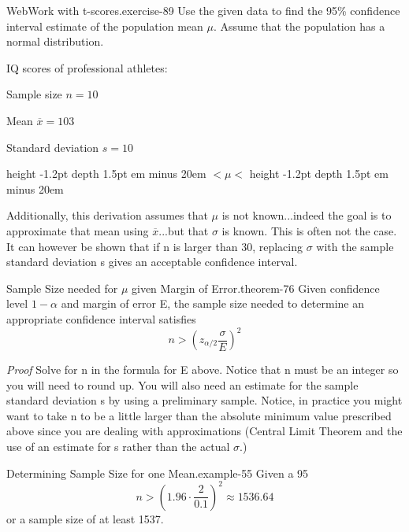 \documentclass[10pt,]{book}
\makeatletter
\newcommand{\fillin}[1]{\leavevmode\leaders\vrule height -1.2pt depth 1.5pt \hskip #1em minus #1em \null}
\renewcommand*{\proofname}{Proof}
\renewenvironment{proof}[1][\proofname]{\par
  \pushQED{\qed}%
  \normalfont \topsep6\p@\@plus6\p@\relax
  \trivlist
  \item\relax
    {\itshape
    #1\@addpunct{.}}\hspace\labelsep\ignorespaces
}{%
  \popQED\endtrivlist\@endpefalse
}
\numberwithin{equation}{section}
\newcommand{\lt}{<}
\newcommand{\gt}{>}
\makeatother
\begin{document}
\begin{inlineexercise}{WebWork with t-scores.}{exercise-89}%
\hypertarget{p-1319}{}%
Use the given data to find the 95\% confidence interval estimate of the population mean \(\mu\). Assume that the population has a normal distribution.%
\par
\hypertarget{p-1320}{}%
IQ scores of professional athletes:%
\par
\hypertarget{p-1321}{}%
Sample size \(n = 10\)%
\par
\hypertarget{p-1322}{}%
Mean \(\overline{x} = 103\)%
\par
\hypertarget{p-1323}{}%
Standard deviation \(s  = 10\)%
\par
\hypertarget{p-1324}{}%
 \fillin{20} \(\lt  \mu \lt \)  \fillin{20}%
\end{inlineexercise}
%
\par
\hypertarget{p-1325}{}%
Additionally, this derivation assumes that \(\mu\) is not known...indeed the goal is to approximate that mean using \(\overline{x}\)...but that \(\sigma\) is known. This is often not the case. It can however be shown that if n is larger than 30, replacing \(\sigma\) with the sample standard deviation s gives an acceptable confidence interval.%
\begin{theorem}{Sample Size needed for \(\mu\) given Margin of Error.}{}{theorem-76}%
\hypertarget{p-1326}{}%
Given confidence level \(1-\alpha\) and margin of error E, the sample size needed to determine an appropriate confidence interval satisfies%
\begin{equation*}
n \gt \left ( z_{\alpha /2} \frac{\sigma}{E} \right )^2
\end{equation*}
%
\end{theorem}
\begin{proof}\hypertarget{proof-74}{}
\hypertarget{p-1327}{}%
Solve for n in the formula for E above. Notice that n must be an integer so you will need to round up. You will also need an estimate for the sample standard deviation s by using a preliminary sample.%
\end{proof}
\hypertarget{p-1328}{}%
Notice, in practice you might want to take n to be a little larger than the absolute minimum value prescribed above since you are dealing with approximations (Central Limit Theorem and the use of an estimate for s rather than the actual \(\sigma\).)%
\begin{example}{Determining Sample Size for one Mean.}{example-55}%
\hypertarget{p-1329}{}%
Given a 95%
\begin{equation*}
n \gt \left ( 1.96 \cdot \frac{2}{0.1} \right )^2 \approx 1536.64
\end{equation*}
or a sample size of at least 1537.%
\end{example}
%
%
\typeout{************************************************}
\typeout{************************************************}
%
\end{document}
